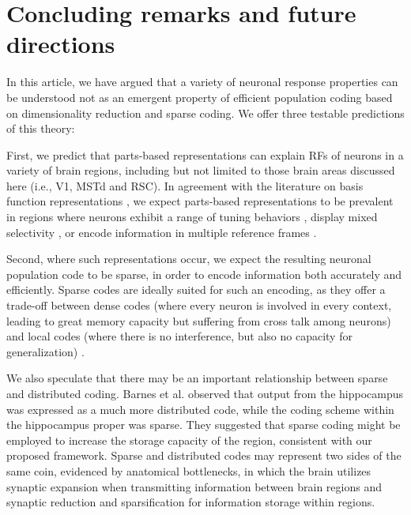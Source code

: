 \section{Concluding remarks and future directions}
\label{sec:conclusion}

In this article,
we have argued that a variety of neuronal response properties can
be understood not as an emergent property of efficient population coding
based on dimensionality reduction and sparse coding.
We offer three testable predictions of this theory:

First, we predict that parts-based representations can explain
\acp{RF} of neurons in a variety of brain regions,
including but not limited to those brain areas discussed here (i.e., V1, MSTd and RSC). In agreement with the literature on basis function representations
\citep{PougetSejnowski1997,PougetSnyder2000,Poggio1990},
we expect parts-based representations
to be prevalent in regions where neurons
exhibit a range of tuning behaviors \citep{Beyeler2016},
display mixed selectivity \citep{Fusi2016,Eichenbaum2017},
or encode information in multiple reference frames \citep{AlexanderNitz2015,Rounds2016}.

Second, where such representations occur, we expect the resulting
neuronal population code to be sparse,
in order to encode information both accurately and efficiently.
Sparse codes are ideally suited for such an encoding, as they offer
a trade-off between 
dense codes (where every neuron is involved in every context,
leading to great memory capacity but suffering from cross talk among neurons)
and local codes (where there is no interference, 
but also no capacity for generalization) \citep{Spanne2015417}.

We also speculate that there may be an important relationship between sparse and distributed coding. Barnes et al. \citep{barnes1990chapter} observed that output from the hippocampus was expressed as a much more distributed code, while the coding scheme within the hippocampus proper was sparse. They suggested that sparse coding might be employed to increase the storage capacity of the region, consistent with our proposed framework. Sparse and distributed codes may represent two sides of the same coin, evidenced by anatomical bottlenecks, in which the brain utilizes synaptic expansion when transmitting information between brain regions and synaptic reduction and sparsification for information storage within regions. 

